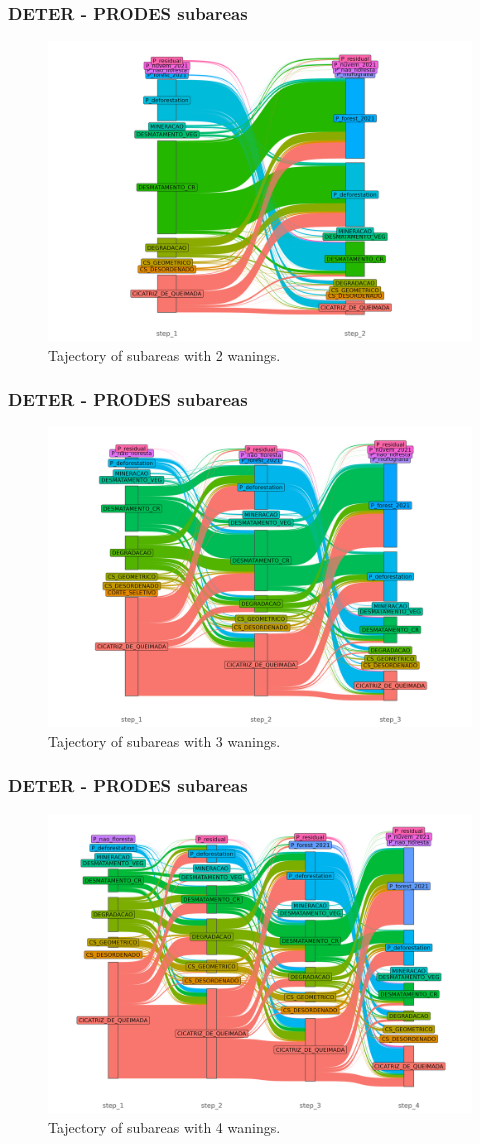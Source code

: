 \documentclass[aspectratio=169]{beamer}
\begin{document}
\begin{frame}
    \frametitle{DETER - PRODES subareas}
    \begin{figure}[h] 
        \includegraphics[width=0.65\linewidth]
        {./figures/plot_deter_prodes_subarea_trajectory_2.png}
        \caption{Tajectory of subareas with 2 wanings.}
        \label{fig:deter_prodes_subarea_trajectory_2}
    \end{figure}
\end{frame}

\begin{frame}
    \frametitle{DETER - PRODES subareas}
    \begin{figure}[h] 
        \includegraphics[width=0.65\linewidth]
        {./figures/plot_deter_prodes_subarea_trajectory_3.png}
        \caption{Tajectory of subareas with 3 wanings.}
        \label{fig:deter_prodes_subarea_trajectory_3}
    \end{figure}
\end{frame}

\begin{frame}
    \frametitle{DETER - PRODES subareas}
    \begin{figure}[h] 
        \includegraphics[width=0.65\linewidth]
        {./figures/plot_deter_prodes_subarea_trajectory_4.png}
        \caption{Tajectory of subareas with 4 wanings.}
        \label{fig:deter_prodes_subarea_trajectory_4}
    \end{figure}
\end{frame}
\end{document}
